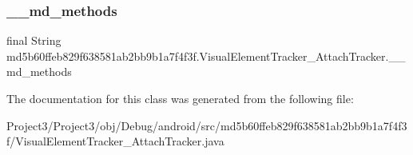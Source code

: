 \subsubsection{\texorpdfstring{\+\_\+\+\_\+md\+\_\+methods}{\_\_md\_methods}}
{\footnotesize\ttfamily final String md5b60ffeb829f638581ab2bb9b1a7f4f3f.\+Visual\+Element\+Tracker\+\_\+\+Attach\+Tracker.\+\_\+\+\_\+md\+\_\+methods\hspace{0.3cm}{\ttfamily [static]}}



The documentation for this class was generated from the following file\+:\begin{DoxyCompactItemize}
\item 
Project3/\+Project3/obj/\+Debug/android/src/md5b60ffeb829f638581ab2bb9b1a7f4f3f/Visual\+Element\+Tracker\+\_\+\+Attach\+Tracker.\+java\end{DoxyCompactItemize}

